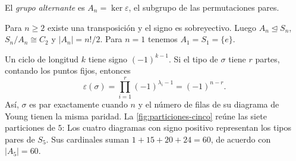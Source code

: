 \begin{defi}
El \emph{grupo alternante} es $A_n=\ker\varepsilon$, el subgrupo de las permutaciones pares.
\end{defi}
Para $n\ge2$ existe una transposición y el signo es sobreyectivo. Luego $A_n\trianglelefteq S_n$, $S_n/A_n\cong C_2$ y $|A_n|=n!/2$. Para $n=1$ tenemos $A_1=S_1=\{e\}$.

Un ciclo de longitud $k$ tiene signo $(-1)^{k-1}$. Si el tipo de $\sigma$ tiene $r$ partes, contando los puntos fijos, entonces
\[
\varepsilon(\sigma)=\prod_{i=1}^r(-1)^{\lambda_i-1}=(-1)^{n-r}.
\]
Así, $\sigma$ es par exactamente cuando $n$ y el número de filas de su diagrama de Young tienen la misma paridad. La \cref{fig:particiones-cinco} reúne las siete particiones de $5$:
Los cuatro diagramas con signo positivo representan los tipos pares de $S_5$. Sus cardinales suman $1+15+20+24=60$, de acuerdo con $|A_5|=60$.
